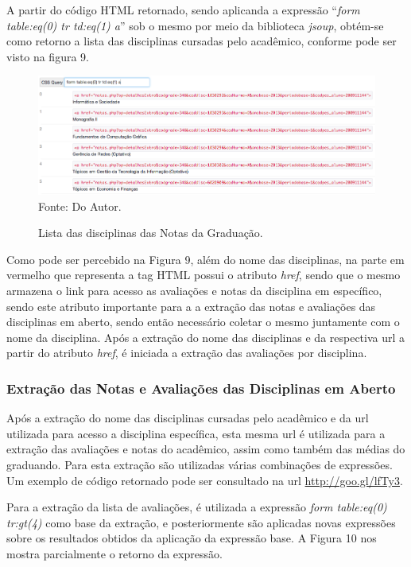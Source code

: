 A partir do código HTML retornado, sendo aplicanda a expressão ``\emph{form table:eq(0) tr td:eq(1) a}'' sob o mesmo por meio da biblioteca \emph{jsoup}, obtém-se como retorno a lista das disciplinas cursadas pelo acadêmico, conforme pode ser visto na figura 9.

\begin{figure}[!htb]
     \centering
     \caption[Extração de Informações - Lista das disciplinas Notas da Graduação]{Lista das disciplinas das Notas da Graduação.}
     \includegraphics[scale=0.45]{imagens/listadisciplinasnotasgraduacao.png}
     \\  Fonte: Do Autor.
\end{figure}

Como pode ser percebido na Figura 9, além do nome das disciplinas, na parte em vermelho que representa a tag HTML possui o atributo \emph{href}, sendo que o mesmo armazena o link para acesso as avaliações e notas da disciplina em específico, sendo este atributo importante para a a extração das notas e avaliações das disciplinas em aberto, sendo então necessário coletar o mesmo juntamente com o nome da disciplina. Após a extração do nome das disciplinas e da respectiva url a partir do atributo \emph{href}, é iniciada a extração das avaliações por disciplina.

\subsubsection{Extração das Notas e Avaliações das Disciplinas em Aberto}
Após a extração do nome das disciplinas cursadas pelo acadêmico e da url utilizada para acesso a disciplina específica, esta mesma url é utilizada para a extração das avaliações e notas do acadêmico, assim como também das médias do graduando. Para esta extração são utilizadas várias combinações de expressões. Um exemplo de código retornado pode ser consultado na url \url{http://goo.gl/lfTy3}.

Para a extração da lista de avaliações, é utilizada a expressão \emph{form table:eq(0) tr:gt(4)} como base da extração, e posteriormente são aplicadas novas expressões sobre os resultados obtidos da aplicação da expressão base. A Figura 10 nos mostra parcialmente o retorno da expressão.

